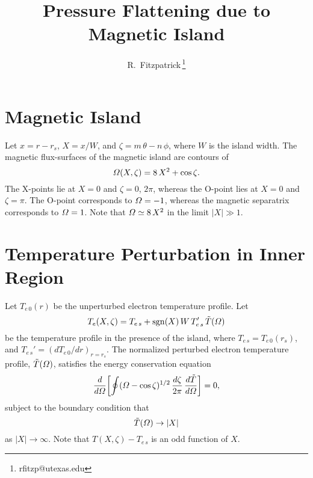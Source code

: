 \documentclass[12pt,prb,aps,notitlepage]{revtex4-1}
\begin{document}
\title{Pressure Flattening due to Magnetic Island}
\author{R.~Fitzpatrick\,\footnote{rfitzp@utexas.edu}}
\begin{abstract}
\end{abstract}
\maketitle

\section{Magnetic Island}
Let $x=r-r_s$, $X=x/W$, and $\zeta= m\,\theta-n\,\phi$, where $W$ is the island width. The magnetic flux-surfaces of the magnetic island are contours of
\begin{equation}
{\mit\Omega}(X,\zeta) = 8\,X^2 + \cos\zeta.
\end{equation}
The X-points lie at $X=0$ and $\zeta = 0$, $2\pi$, whereas the O-point lies at
$X=0$ and $\zeta=\pi$. The O-point corresponds to ${\mit\Omega}=-1$, whereas the magnetic separatrix corresponds to ${\mit\Omega}=1$.  Note that ${\mit\Omega}\simeq
8\,X^2$ in the limit $|X|\gg 1$. 

\section{Temperature Perturbation in Inner Region}
Let $T_{e\,0}(r)$ be the unperturbed electron temperature profile. Let 
\begin{equation}\label{e2}
T_e(X,\zeta) = T_{e\,s} + {\rm sgn}(X)\,W\,T_{e\,s}'\,\tilde{T}({\mit\Omega})
\end{equation}
 be the temperature profile in the presence of the island,
where $T_{e\,s}=T_{e\,0}(r_s)$, and  $T_{e\,s}'=(dT_{e\,0}/dr)_{r=r_s}$. 
The normalized perturbed electron temperature profile, $\tilde{T}({\mit\Omega})$,  satisfies the energy conservation equation
\begin{equation}\label{e3}
\frac{d}{d{\mit\Omega}}\!\left[\oint({\mit\Omega}-\cos\zeta)^{1/2}\,\frac{d\zeta}{2\pi}\,\frac{d\tilde{T}}{d
{\mit\Omega}} \right]= 0,
\end{equation}
subject to the boundary condition that
\begin{equation}\label{e4}
\tilde{T}({\mit\Omega}) \rightarrow |X|
\end{equation}
as $|X|\rightarrow\infty$. Note that $T(X,\zeta)-T_{e\,s}$ is an odd function of $X$. 
\end{document}
